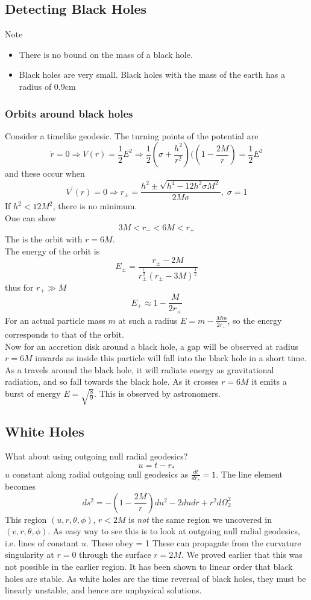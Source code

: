 \documentclass{article}
\begin{document}
\subsection{Detecting Black Holes} 
Note 
\begin{itemize}
    \item There is no bound on the mass of a black hole.
    \item Black holes are very small. Black holes with the mass of the earth has a radius of 0.9cm
\end{itemize}

\subsubsection*{Orbits around black holes}
Consider a timelike geodesic. The turning points of the potential are
\[
\dot{r}=0 \Rightarrow V(r) = \frac{1}{2}E^2 \Rightarrow \frac{1}{2} \left( \sigma + \frac{h^2}{r^2} \right) (\left(1-\frac{2M}{r}\right) = \frac{1}{2}E^2
\]
and these occur when
\[
V^\prime(r)=0 \Rightarrow r_\pm = \frac{h^2 \pm \sqrt{h^4 - 12h^2 \sigma M^2}}{2M\sigma}, \; \sigma=1
\]
If $h^2<12M^2$, there is no minimum. \\
One can show 
\[
3M < r_- < 6M < r_+
\]
The  is the orbit with $r=6M$. \\
The energy of the orbit is 
\[
E_\pm = \frac{r_\pm - 2M}{r_\pm^\frac{1}{2}(r_\pm-3M)^\frac{1}{2}}
\]
thus for $r_+\gg M$
\[
E_+ \approx 1-\frac{M}{2r_+}
\]
For an actual particle mass $m$ at such a radius $E=m-\frac{Mm}{2r_+}$, so the energy corresponds to that of the orbit. \\
Now for an accretion disk around a black hole, a gap will be observed at radius $r=6M$ inwards as inside this particle will fall into the black hole in a short time. As a travels around the black hole, it will radiate energy as gravitational radiation, and so fall towards the black hole. As it crosses $r=6M$ it emits a burst of energy $E=\sqrt{\frac{8}{9}}$. This is observed by astronomers. 

\subsection{White Holes}
What about using outgoing null radial geodesics? 
\[
u=t-r_\ast
\]
$u$ constant along radial outgoing null geodesics as $\frac{dt}{dr_\ast}=1$. The line element becomes 
\[
ds^2 = -(1-\frac{2M}{r}) du^2 - 2dudr + r^2 d\Omega^2_2
\]
This region $(u,r,\theta,\phi)$, $r<2M$ is \emph{not} the same region we uncovered in $(v,r,\theta,\phi)$. As easy way to see this is to look at outgoing null radial geodesics, i.e. lines of constant $u$. These obey 
\be\label{eq:BH:5}
 = 1 
\ee
These can propagate from the curvature singularity at $r=0$ through the surface $r=2M$. We proved earlier that this was not possible in the earlier region. It has been shown to linear order that black holes are stable. As white holes are the time reversal of black holes, they must be linearly unstable, and hence are unphysical solutions. 
\end{document}
